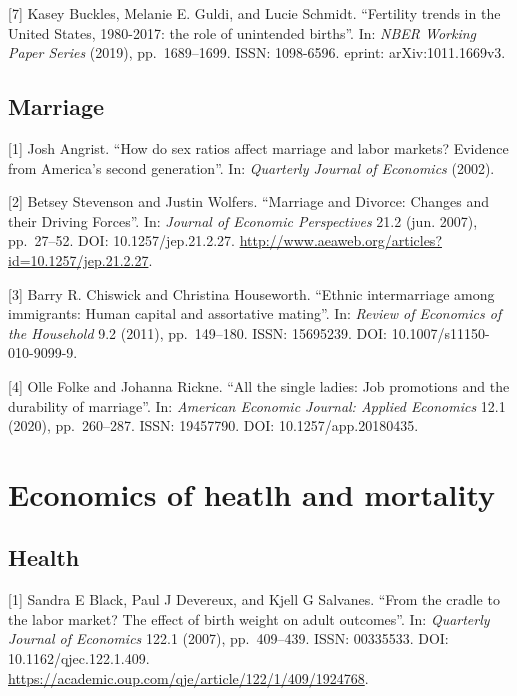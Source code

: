\documentclass[
  12pt,
]{article}
\begin{document}
{[}7{]} Kasey Buckles, Melanie E. Guldi, and Lucie Schmidt. ``Fertility
trends in the United States, 1980-2017: the role of unintended births''.
In: \emph{NBER Working Paper Series} (2019), pp.~1689--1699. ISSN:
1098-6596. eprint: arXiv:1011.1669v3.

\hypertarget{marriage}{%
\subsection{Marriage}\label{marriage}}

{[}1{]} Josh Angrist. ``How do sex ratios affect marriage and labor
markets? Evidence from America's second generation''. In:
\emph{Quarterly Journal of Economics} (2002).

{[}2{]} Betsey Stevenson and Justin Wolfers. ``Marriage and Divorce:
Changes and their Driving Forces''. In:
\emph{Journal of Economic Perspectives} 21.2 (jun. 2007), pp.~27--52.
DOI: 10.1257/jep.21.2.27.
\url{http://www.aeaweb.org/articles?id=10.1257/jep.21.2.27}.

{[}3{]} Barry R. Chiswick and Christina Houseworth. ``Ethnic
intermarriage among immigrants: Human capital and assortative mating''.
In: \emph{Review of Economics of the Household} 9.2 (2011),
pp.~149--180. ISSN: 15695239. DOI: 10.1007/s11150-010-9099-9.

{[}4{]} Olle Folke and Johanna Rickne. ``All the single ladies: Job
promotions and the durability of marriage''. In:
\emph{American Economic Journal: Applied Economics} 12.1 (2020),
pp.~260--287. ISSN: 19457790. DOI: 10.1257/app.20180435.

\hypertarget{economics-of-heatlh-and-mortality}{%
\section{\texorpdfstring{\textbf{Economics of heatlh and
mortality}}{Economics of heatlh and mortality}}\label{economics-of-heatlh-and-mortality}}

\hypertarget{health}{%
\subsection{Health}\label{health}}

{[}1{]} Sandra E Black, Paul J Devereux, and Kjell G Salvanes. ``From
the cradle to the labor market? The effect of birth weight on adult
outcomes''. In: \emph{Quarterly Journal of Economics} 122.1 (2007),
pp.~409--439. ISSN: 00335533. DOI: 10.1162/qjec.122.1.409.
\url{https://academic.oup.com/qje/article/122/1/409/1924768}.
\end{document}
